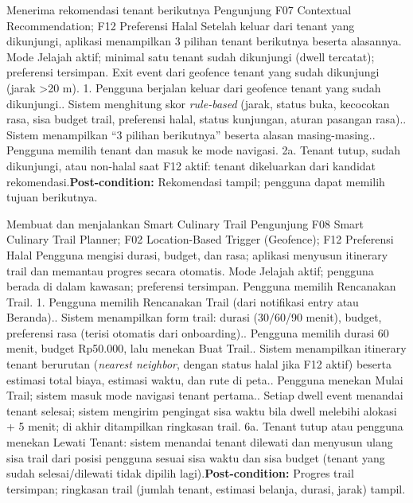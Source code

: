 {Menerima rekomendasi tenant berikutnya}
{Pengunjung}
{F07 Contextual Recommendation; F12 Preferensi Halal}
{Setelah keluar dari tenant yang dikunjungi, aplikasi menampilkan 3 pilihan tenant berikutnya beserta alasannya.}
{Mode Jelajah aktif; minimal satu tenant sudah dikunjungi (dwell tercatat); preferensi tersimpan.}
{Exit event dari geofence tenant yang sudah dikunjungi (jarak >20 m).}
{1. Pengguna berjalan keluar dari geofence tenant yang sudah dikunjungi.. Sistem menghitung skor \textit{rule-based} (jarak, status buka, kecocokan rasa, sisa budget trail, preferensi halal, status kunjungan, aturan pasangan rasa).. Sistem menampilkan ``3 pilihan berikutnya'' beserta alasan masing-masing.. Pengguna memilih tenant dan masuk ke mode navigasi.}
{2a. Tenant tutup, sudah dikunjungi, atau non-halal saat F12 aktif: tenant dikeluarkan dari kandidat rekomendasi.\newline\textbf{Post-condition:} Rekomendasi tampil; pengguna dapat memilih tujuan berikutnya.}

{Membuat dan menjalankan Smart Culinary Trail}
{Pengunjung}
{F08 Smart Culinary Trail Planner; F02 Location-Based Trigger (Geofence); F12 Preferensi Halal}
{Pengguna mengisi durasi, budget, dan rasa; aplikasi menyusun itinerary trail dan memantau progres secara otomatis.}
{Mode Jelajah aktif; pengguna berada di dalam kawasan; preferensi tersimpan.}
{Pengguna memilih Rencanakan Trail.}
{1. Pengguna memilih Rencanakan Trail (dari notifikasi entry atau Beranda).. Sistem menampilkan form trail: durasi (30/60/90 menit), budget, preferensi rasa (terisi otomatis dari onboarding).. Pengguna memilih durasi 60 menit, budget Rp50.000, lalu menekan Buat Trail.. Sistem menampilkan itinerary tenant berurutan (\textit{nearest neighbor}, dengan status halal jika F12 aktif) beserta estimasi total biaya, estimasi waktu, dan rute di peta.. Pengguna menekan Mulai Trail; sistem masuk mode navigasi tenant pertama.. Setiap dwell event menandai tenant selesai; sistem mengirim pengingat sisa waktu bila dwell melebihi alokasi + 5 menit; di akhir ditampilkan ringkasan trail.}
{6a. Tenant tutup atau pengguna menekan Lewati Tenant: sistem menandai tenant dilewati dan menyusun ulang sisa trail dari posisi pengguna sesuai sisa waktu dan sisa budget (tenant yang sudah selesai/dilewati tidak dipilih lagi).\newline\textbf{Post-condition:} Progres trail tersimpan; ringkasan trail (jumlah tenant, estimasi belanja, durasi, jarak) tampil.}

